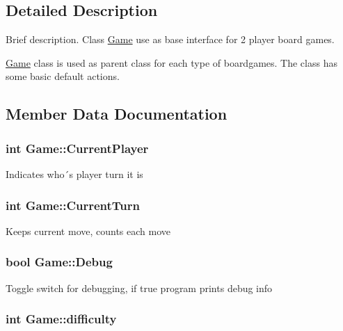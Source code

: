 \subsection{Detailed Description}
Brief description. Class \hyperlink{class_game}{Game} use as base interface for 2 player board games. 

\hyperlink{class_game}{Game} class is used as parent class for each type of boardgames. The class has some basic default actions. 

\subsection{Member Data Documentation}
\hypertarget{class_game_a661282d67a0e4a972293c98478bc02e4}{
\subsubsection[{Current\-Player}]{\setlength{\rightskip}{0pt plus 5cm}int Game\-::\-Current\-Player\hspace{0.3cm}{\ttfamily [protected]}}}\label{class_game_a661282d67a0e4a972293c98478bc02e4}
Indicates who´s player turn it is \hypertarget{class_game_a88700a4643e08b12130ba2950c54ed8b}{
\subsubsection[{Current\-Turn}]{\setlength{\rightskip}{0pt plus 5cm}int Game\-::\-Current\-Turn\hspace{0.3cm}{\ttfamily [protected]}}}\label{class_game_a88700a4643e08b12130ba2950c54ed8b}
Keeps current move, counts each move \hypertarget{class_game_ad79740c2d2fa299cf322bf6ea322d9aa}{
\subsubsection[{Debug}]{\setlength{\rightskip}{0pt plus 5cm}bool Game\-::\-Debug}}\label{class_game_ad79740c2d2fa299cf322bf6ea322d9aa}
Toggle switch for debugging, if true program prints debug info \hypertarget{class_game_a536a6390d16f05d402928bd731e06ef3}{
\subsubsection[{difficulty}]{\setlength{\rightskip}{0pt plus 5cm}int Game\-::difficulty\hspace{0.3cm}{\ttfamily [protected]}}}\label{class_game_a536a6390d16f05d402928bd731e06ef3}
